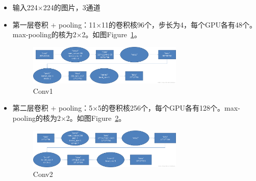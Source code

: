 \documentclass[12pt]{article}
\begin{document}
\begin{itemize}
\item 输入224$\times$224的图片，3通道
\item 第一层卷积 + pooling：11$\times$11的卷积核96个，步长为4，每个GPU各有48个。max-pooling的核为2$\times$2。如图Figure~\ref{fig:conv1}。
	\begin{figure}[!ht]
	\centering
	\includegraphics[width=0.7\textwidth]{conv1_1}
	\caption{Conv1}
	\label{fig:conv1}
	\end{figure}
\end{itemize}

\begin{itemize}
\item 第二层卷积 + pooling：5$\times$5的卷积核256个，每个GPU各有128个。max-pooling的核为2$\times$2。如图Figure~\ref{fig:conv2}。
	\begin{figure}[!ht]
	\centering
	\includegraphics[width=0.7\textwidth]{conv2_2}
	\caption{Conv2}
	\label{fig:conv2}
	\end{figure}
\end{itemize}
\end{document}
